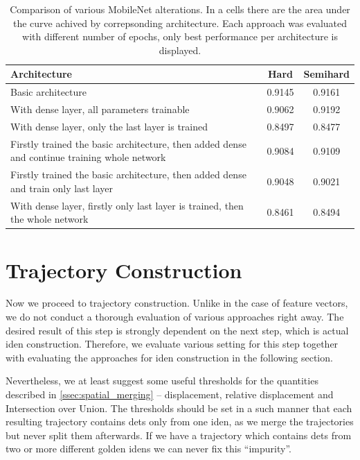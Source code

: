 \begin{table}[]
    \centering
    \begin{tabularx}{\textwidth}{X|c|c}
          Architecture & Hard & Semihard \\
          \hline
         Basic architecture & 0.9145 & 0.9161 \\
         With dense layer, all parameters trainable & 0.9062 & 0.9192 \\
         With dense layer, only the last layer is trained & 0.8497 & 0.8477 \\
         Firstly trained the basic architecture, then added dense and continue training whole network & 0.9084 & 0.9109 \\
         Firstly trained the basic architecture, then added dense and train only last layer & 0.9048 & 0.9021 \\
         With dense layer, firstly only last layer is trained, then the whole network & 0.8461 & 0.8494
    \end{tabularx}
    \caption[Comparison of various MobileNet alterations]{Comparison of various MobileNet alterations. In a cells there are the area under the curve achived by correpsonding architecture. Each approach was evaluated with different number of epochs, only best performance per architecture is displayed.}
    \label{tab:final_comparison}
\end{table}


\section{Trajectory Construction}

Now we proceed to trajectory construction. Unlike in the case of feature vectors, we do not conduct a thorough evaluation of various approaches right away. The desired result of this step is strongly dependent on the next step, which is actual \gls{iden} construction. Therefore, we evaluate various setting for this step together with evaluating the approaches for \gls{iden} construction in the following section.

Nevertheless, we at least suggest some useful thresholds for the quantities described in \autoref{ssec:spatial_merging} -- displacement, relative displacement and Intersection over Union. The thresholds should be set in a such manner that each resulting trajectory contains \glspl{det} only from one \gls{iden}, as we merge the trajectories but never split them afterwards. If we have a trajectory which contains \glspl{det} from two or more different golden \glspl{iden} we can never fix this ``impurity''.

